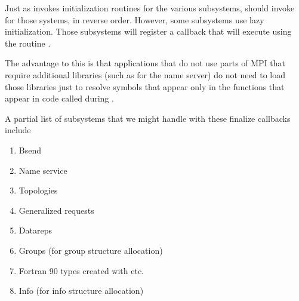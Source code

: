 \documentclass{article}
\begin{document}
Just as  invokes initialization routines for
the various subsystems,  should invoke
 for those systems, in reverse order.
However, some subsystems use lazy initialization.  Those subsystems will
register a callback that  will execute using the routine
.  




The advantage to this is that applications that do not use parts of
MPI that require additional libraries (such as  for the
name server) do not need to load those libraries just to resolve
symbols that appear only in the functions that appear in code called
during .  

A partial list of subsystems that we might handle with these finalize
callbacks include 
\begin{enumerate}
\item Bsend 
\item Name service
\item Topologies
\item Generalized requests
\item Datareps
\item Groups (for group structure allocation)
\item Fortran 90 types created with  etc.
\item Info (for info structure allocation)
\end{enumerate}
\end{document}
